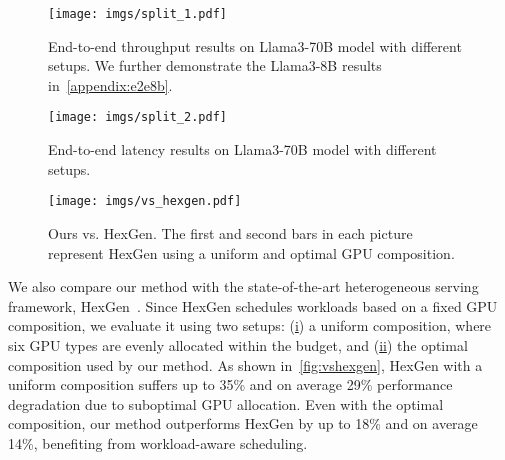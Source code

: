 \begin{figure}[!t]
    \centering
    \texttt{[image: imgs/split\_1.pdf]}
    \caption{\small{End-to-end throughput results on Llama3-70B model with different setups. We further demonstrate the Llama3-8B results in~\autoref{appendix:e2e8b}.}}
    \label{fig:e2e}
    \vspace{-1em}
\end{figure}

\begin{figure}[!t]
    \centering
    \texttt{[image: imgs/split\_2.pdf]}
    \caption{\small{End-to-end latency results on Llama3-70B model with different setups.}}
    \label{fig:e2e1}
    \vspace{-1em}
\end{figure}


\begin{figure}[!t]
    \centering
    \texttt{[image: imgs/vs\_hexgen.pdf]}
    \caption{\small{Ours vs. HexGen. The first and second bars in each picture represent HexGen using a uniform and optimal GPU composition.}}
    \label{fig:vshexgen}
    \vspace{-1em}
\end{figure}


We also compare our method with the state-of-the-art heterogeneous serving framework, HexGen~\cite{jiang2023hexgen}. Since HexGen schedules workloads based on a fixed GPU composition, we evaluate it using two setups: (\underline{i}) a uniform composition, where six GPU types are evenly allocated within the budget, and (\underline{ii}) the optimal composition used by our method. As shown in~\autoref{fig:vshexgen}, HexGen with a uniform composition suffers up to 35\% and on average 29\% performance degradation due to suboptimal GPU allocation. Even with the optimal composition, our method outperforms HexGen by up to 18\% and on average 14\%, benefiting from workload-aware scheduling.


